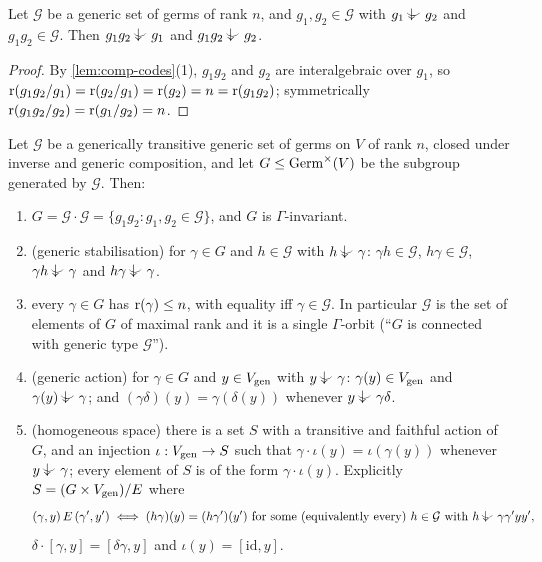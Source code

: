 \begin{lemma}
\label{lem:prod-indep}
Let $\mathcal G$ be a generic set of germs of rank $n$, and $g_1,g_2\in\mathcal G$ with
$g_1\ind{}g_2$ and $g_1g_2\in\mathcal G$.  Then $g_1g_2\ind{}g_1$ and $g_1g_2\ind{}g_2$.
\end{lemma}
\begin{proof}
By \cref{lem:comp-codes}(1), $g_1g_2$ and $g_2$ are interalgebraic over $g_1$, so
$\operatorname{r}(g_1g_2/g_1)=\operatorname{r}(g_2/g_1)=\operatorname{r}(g_2)=n=\operatorname{r}(g_1g_2)$; symmetrically
$\operatorname{r}(g_1g_2/g_2)=\operatorname{r}(g_1/g_2)=n$.
\end{proof}

\begin{theorem}\label{thm:hw}
Let $\mathcal G$ be a generically transitive generic set of germs on $V$ of rank $n$,
closed under inverse and generic composition, and let $G\le\operatorname{Germ}^\times(V)$ be the
subgroup generated by $\mathcal G$.  Then:
\begin{enumerate}[label=\textup{(\alph*)}]
\item\label{hw:two} $G=\mathcal G\cdot\mathcal G=\{g_1g_2:g_1,g_2\in\mathcal G\}$, and $G$ is
  $\Gamma$-invariant.
\item\label{hw:stab} (generic stabilisation) for $\gamma\in G$ and $h\in\mathcal G$ with
  $h\ind{}\gamma$: $\gamma h\in\mathcal G$, $h\gamma\in\mathcal G$, $\gamma h\ind{}\gamma$ and
  $h\gamma\ind{}\gamma$.
\item\label{hw:rank} every $\gamma\in G$ has $\operatorname{r}(\gamma)\le n$, with equality iff
  $\gamma\in\mathcal G$.  In particular $\mathcal G$ is the set of elements of $G$ of maximal
  rank and it is a single $\Gamma$-orbit (``$G$ is connected with generic type
  $\mathcal G$'').
\item\label{hw:action} (generic action) for $\gamma\in G$ and $y\in V_{\operatorname{gen}}$ with
  $y\ind{}\gamma$: $\gamma(y)\in V_{\operatorname{gen}}$ and $\gamma(y)\ind{}\gamma$; and
  $(\gamma\delta)(y)=\gamma(\delta(y))$ whenever $y\ind{}\gamma\delta$.
\item\label{hw:space} (homogeneous space) there is a set $S$ with a transitive and
  faithful action of $G$, and an injection $\iota:V_{\operatorname{gen}}\to S$ such that
  $\gamma\cdot\iota(y)=\iota(\gamma(y))$ whenever $y\ind{}\gamma$; every element of $S$ is
  of the form $\gamma\cdot\iota(y)$.  Explicitly $S=(G\times V_{\operatorname{gen}})/E$ where
  \[
    (\gamma,y)\,E\,(\gamma',y')\iff (h\gamma)(y)=(h\gamma')(y')
    \text{ for some (equivalently every) } h\in\mathcal G\text{ with } h\ind{}\gamma\gamma'yy',
  \]
  $\delta\cdot[\gamma,y]=[\delta\gamma,y]$ and $\iota(y)=[\mathrm{id},y]$.
\end{enumerate}
\end{theorem}


